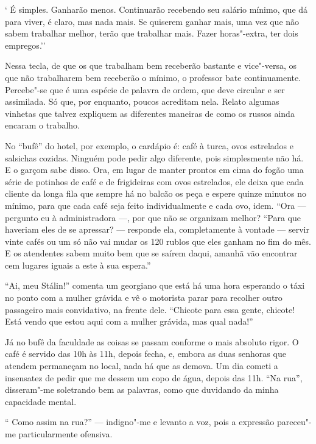 ` É simples. Ganharão menos. Continuarão recebendo seu salário mínimo,
que dá para viver, é claro, mas nada mais. Se quiserem ganhar mais, uma
vez que não sabem trabalhar melhor, terão que trabalhar mais. Fazer
horas"-extra, ter dois empregos.''

Nessa tecla, de que os que trabalham bem receberão bastante e
vice"-versa, os que não trabalharem bem receberão o mínimo, o professor
bate continuamente. Percebe"-se que é uma espécie de palavra de ordem,
que deve circular e ser assimilada. Só que, por enquanto, poucos
acreditam nela. Relato algumas vinhetas que talvez expliquem as
diferentes maneiras de como os russos ainda encaram o trabalho.

No ``bufê'' do hotel, por exemplo, o cardápio é: café à turca, ovos
estrelados e salsichas cozidas. Ninguém pode pedir algo diferente, pois
simplesmente não há. E o garçom sabe disso. Ora, em lugar de manter
prontos em cima do fogão uma série de potinhos de café e de frigideiras
com ovos estrelados, ele deixa que cada cliente da longa fila que sempre
há no balcão os peça e espere quinze minutos no mínimo, para que cada
café seja feito individualmente e cada ovo, idem. ``Ora --- pergunto eu à
administradora ---, por que não se organizam melhor? ``Para que haveriam
eles de se apressar? --- responde ela, completamente à vontade --- servir
vinte cafés ou um só não vai mudar os 120 rublos que eles ganham no fim
do mês. E os atendentes sabem muito bem que se saírem daqui, amanhã vão
encontrar cem lugares iguais a este à sua espera.''

``Ai, meu Stálin!'' comenta um georgiano que está há uma hora esperando
o táxi no ponto com a mulher grávida e vê o motorista parar para
recolher outro passageiro mais convidativo, na frente dele. ``Chicote
para essa gente, chicote! Está vendo que estou aqui com a mulher
grávida, mas qual nada!''

Já no bufê da faculdade as coisas se passam conforme o mais absoluto
rigor. O café é servido das 10h às 11h, depois fecha, e, embora as duas
senhoras que atendem permaneçam no local, nada há que as demova. Um dia
cometi a insensatez de pedir que me dessem um copo de água, depois das
11h. ``Na rua'', disseram"-me soletrando bem as palavras, como que
duvidando da minha capacidade mental.

`` Como assim na rua?'' --- indigno"-me e levanto a voz, pois a expressão
pareceu"-me particularmente ofensiva.

